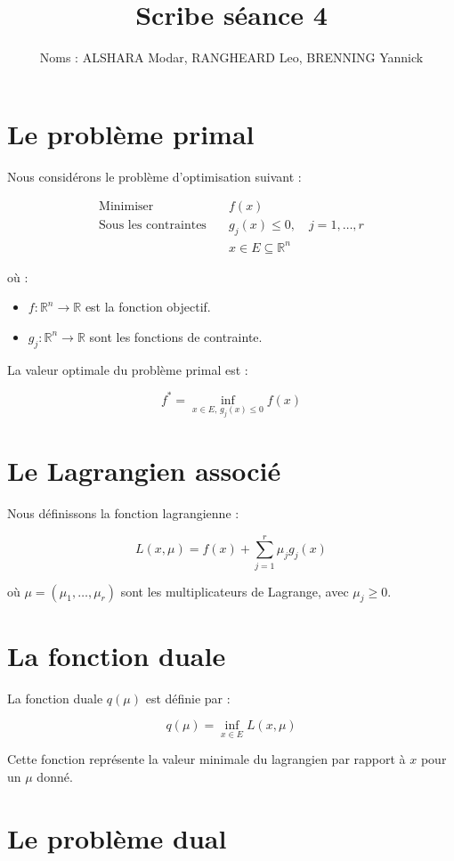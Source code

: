 \documentclass{article}
\title{Scribe séance 4}
\author{Noms : ALSHARA Modar, RANGHEARD Leo, BRENNING Yannick}
\begin{document}
\maketitle

\section{Le problème primal}

Nous considérons le problème d'optimisation suivant :

\begin{align*}
\text{Minimiser} \quad & f(x) \\
\text{Sous les contraintes} \quad & g_j(x) \leq 0, \quad j = 1, \dotsc, r \\
& x \in E \subseteq \mathbb{R}^n
\end{align*}

où :
\begin{itemize}
    \item $f: \mathbb{R}^n \to \mathbb{R}$ est la fonction objectif.
    \item $g_j: \mathbb{R}^n \to \mathbb{R}$ sont les fonctions de contrainte.
\end{itemize}

La valeur optimale du problème primal est :

\[
f^* = \inf_{x \in E, \, g_j(x) \leq 0} f(x)
\]

\section{Le Lagrangien associé}

Nous définissons la fonction lagrangienne :

\[
L(x, \mu) = f(x) + \sum_{j=1}^r \mu_j g_j(x)
\]

où $\mu = (\mu_1, \dotsc, \mu_r)$ sont les multiplicateurs de Lagrange, avec $\mu_j \geq 0$.

\section{La fonction duale}

La fonction duale $q(\mu)$ est définie par :

\[
q(\mu) = \inf_{x \in E} L(x, \mu)
\]

Cette fonction représente la valeur minimale du lagrangien par rapport à $x$ pour un $\mu$ donné.

\section{Le problème dual}
\end{document}
